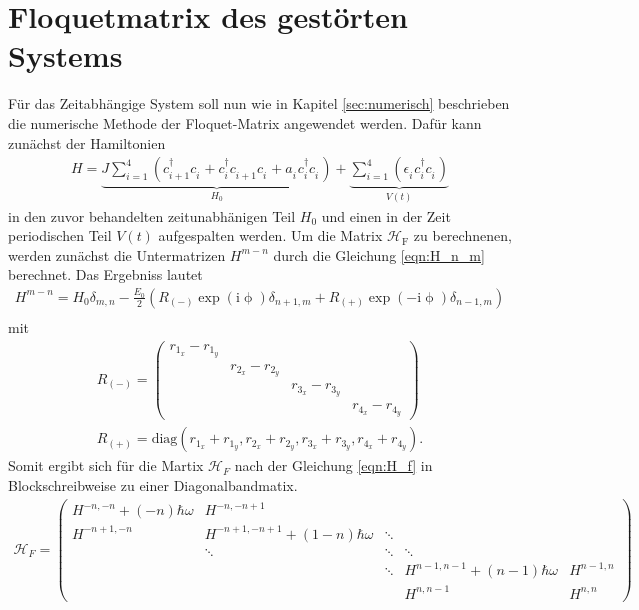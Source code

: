 \section{Floquetmatrix des gestörten Systems}
Für das Zeitabhängige System soll nun wie in Kapitel \ref{sec:numerisch} beschrieben die numerische Methode der Floquet-Matrix angewendet werden.
Dafür kann zunächst der Hamiltonien
\begin{align}
H=\underbrace{J\sum_{i=1}^4 \left(c_{i+1}^\dag c_i^{\phantom{\dag}} + c_{i}^\dag c_{i+1}^{\phantom{\dag}}c_i^{\phantom{\dag}} + a_i^{\phantom{\dag}} c_i^\dag c_i^{\phantom{\dag}}
 \right)}_{H_0} +\underbrace{\sum_{i=1}^4\left(\epsilon_i^{\phantom{\dag}} c_i^\dag c_i^{\phantom{\dag}}\right)}_{V(t)}
\end{align}
in den zuvor behandelten zeitunabhänigen Teil $H_0$ und einen in der Zeit periodischen Teil $V(t)$ aufgespalten werden.
Um die Matrix $\mathcal{H}_\mathrm{F}$ zu berechnenen, werden zunächst die Untermatrizen $H^{m-n}$
durch die Gleichung \eqref{eqn:H_n_m} berechnet.
Das Ergebniss lautet
\begin{align}
  H^{m-n}=H_0\delta_{m,n} -\frac{E_0}{2}\left(R_{(-)} \exp\left( \mathrm{i}\upphi\right)\delta_{n+1,m}   +  R_{(+)}\exp\left( -\mathrm{i}\upphi\right)\delta_{n-1,m}\right)\\
\end{align}
mit
\begin{align}
  R_{(-)}=
\begin{pmatrix}
  r_{1_x}-r_{1_y}& & & \\
  &r_{2_x}-r_{2_y} & & \\
  & & r_{3_x}-r_{3_y}& \\
  & & & r_{4_x}-r_{4_y}
\end{pmatrix}\\
R_{(+)}= \text{diag}\left(
r_{1_x}+r_{1_y},
r_{2_x}+r_{2_y},
r_{3_x}+r_{3_y},
r_{4_x}+r_{4_y}\right).
\end{align}
Somit ergibt sich für die Martix $\mathcal{H}_F$ nach der Gleichung \eqref{eqn:H_f} in
Blockschreibweise zu einer Diagonalbandmatix.
\begin{align}
  \mathcal{H}_F=\begin{pmatrix}
  H^{-n ,-n}+(-n)\hbar\omega  &  H^{-n,-n+1}       &       &    & \\
  H^{-n+1,-n} &    H^{-n+1,-n+1}+(1-n)\hbar\omega  & \ddots&    & \\
            &          \ddots                      & \ddots&  \ddots      &    \\
            &                                      & \ddots&  H^{n-1,n-1}+(n-1)\hbar\omega  & H^{n-1,n}  \\
            &                                      &       & H^{n,n-1}   & H^{n,n}
\end{pmatrix}
\end{align}
